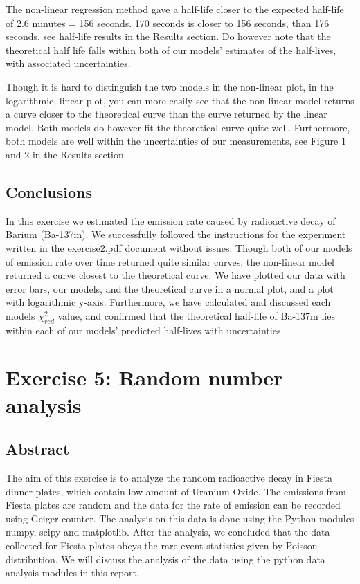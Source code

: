 \documentclass[letterpaper,12pt]{article}
\begin{document}
The non-linear regression method gave a half-life closer to the expected 
half-life of 2.6 minutes = 156 seconds. 170 seconds is closer to 156 seconds, 
than 176 seconds, see half-life results in the Results section. Do however note 
that the theoretical half life falls within both of our models’ estimates of 
the half-lives, with associated uncertainties.

Though it is hard to distinguish the two models in the non-linear plot, in the 
logarithmic, linear plot, you can more easily see that the non-linear model 
returns a curve closer to the theoretical curve than the curve returned by the 
linear model. Both models do however fit the theoretical curve quite well. 
Furthermore, both models are well within the uncertainties of our measurements, 
see Figure 1 and 2 in the Results section.

\subsection{Conclusions}

In this exercise we estimated the emission rate caused by radioactive 
decay of Barium (Ba-137m). We successfully followed the instructions for 
the experiment written in the exercise2.pdf document without issues. 
Though both of our models of emission rate over time returned quite similar 
curves, the non-linear model returned a curve closest to the theoretical curve. 
We have plotted our data with error bars, our models, and the theoretical 
curve in a normal plot, and a plot with logarithmic y-axis. Furthermore, 
we have calculated and discussed each models $\chi^2_{red}$ value, 
and confirmed that the theoretical half-life of Ba-137m lies within each of 
our models’ predicted half-lives with uncertainties. 

\pagebreak

\section{Exercise 5:  Random number analysis}

\subsection{Abstract}
The aim of this exercise is to analyze the random radioactive decay in Fiesta dinner plates, which 
contain low amount of Uranium Oxide. The emissions from Fiesta plates are random and the data for 
the rate of emission can be recorded using Geiger counter. The analysis on this data is done using
the Python modules numpy, scipy and matplotlib. After the analysis, we concluded that the data 
collected for Fiesta plates obeys the rare event statistics given by Poisson distribution. We will discuss
the analysis of the data using the python data analysis modules in this report.
\end{document}
